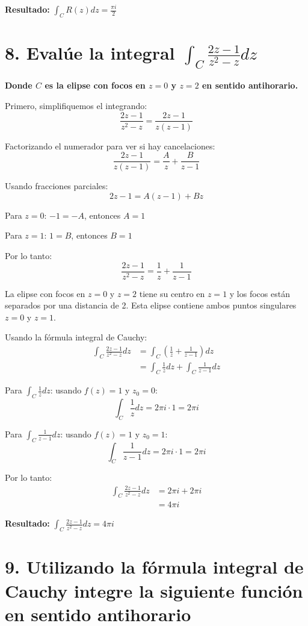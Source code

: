 \documentclass{article}
\begin{document}
\textbf{Resultado:} $\int_C R(z) dz = \frac{\pi i}{2}$

\section*{8. Evalúe la integral $\int_C \frac{2z - 1}{z^2 - z} dz$}

\textbf{Donde $C$ es la elipse con focos en $z = 0$ y $z = 2$ en sentido antihorario.}

Primero, simplifiquemos el integrando:
$$\frac{2z - 1}{z^2 - z} = \frac{2z - 1}{z(z - 1)}$$

Factorizando el numerador para ver si hay cancelaciones:
$$\frac{2z - 1}{z(z - 1)} = \frac{A}{z} + \frac{B}{z - 1}$$

Usando fracciones parciales:
$$2z - 1 = A(z - 1) + Bz$$

Para $z = 0$: $-1 = -A$, entonces $A = 1$

Para $z = 1$: $1 = B$, entonces $B = 1$

Por lo tanto:
$$\frac{2z - 1}{z^2 - z} = \frac{1}{z} + \frac{1}{z - 1}$$

La elipse con focos en $z = 0$ y $z = 2$ tiene su centro en $z = 1$ y los focos están separados por una distancia de 2. Esta elipse contiene ambos puntos singulares $z = 0$ y $z = 1$.

Usando la fórmula integral de Cauchy:
\begin{align*}
\int_C \frac{2z - 1}{z^2 - z} dz &= \int_C \left(\frac{1}{z} + \frac{1}{z - 1}\right) dz \\
                                 &= \int_C \frac{1}{z} dz + \int_C \frac{1}{z - 1} dz
\end{align*}

Para $\int_C \frac{1}{z} dz$: usando $f(z) = 1$ y $z_0 = 0$:
$$\int_C \frac{1}{z} dz = 2\pi i \cdot 1 = 2\pi i$$

Para $\int_C \frac{1}{z - 1} dz$: usando $f(z) = 1$ y $z_0 = 1$:
$$\int_C \frac{1}{z - 1} dz = 2\pi i \cdot 1 = 2\pi i$$

Por lo tanto:
\begin{align*}
\int_C \frac{2z - 1}{z^2 - z} dz &= 2\pi i + 2\pi i \\
                                 &= 4\pi i
\end{align*}

\textbf{Resultado:} $\int_C \frac{2z - 1}{z^2 - z} dz = 4\pi i$

\section*{9. Utilizando la fórmula integral de Cauchy integre la siguiente función en sentido antihorario}
\end{document}
